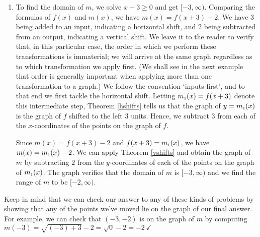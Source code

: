 {\begin{enumerate}


\item  To find the domain of $m$, we solve $x+3 \geq 0$ and get $[-3, \infty)$.  Comparing the formulas of $f(x)$ and $m(x)$, we have $m(x) = f(x+3) - 2$.  We have $3$ being added to an input, indicating a horizontal shift,  and $2$ being subtracted from an output, indicating a vertical shift. We leave it to the reader to verify that, in this particular case, the order in which we perform these transformations is immaterial;  we will arrive at the same graph regardless as to which transformation we apply first. (We shall see in the next example that order is  generally important when applying more than one transformation to a graph.) We follow the convention `inputs first', and to that end we first tackle the horizontal shift.  Letting $m_{\mbox{\tiny$1$}}(x) = f(x+3)$ denote this intermediate step,  Theorem \ref{hshifts} tells us that the graph of $y=m_{\mbox{\tiny$1$}}(x)$ is the graph of $f$ shifted to the left $3$ units. Hence, we subtract $3$ from each of the $x$-coordinates of the points on the graph of $f$.  


Since $m(x) = f(x+3)-2$ and $f(x+3) = m_{\mbox{\tiny$1$}}(x)$, we have $m(x) = m_{\mbox{\tiny$1$}}(x) - 2$.  We can apply  Theorem \ref{vshifts} and obtain the graph of $m$ by subtracting $2$ from the $y$-coordinates of each of the points on the graph of $m_{\mbox{\tiny$1$}}(x)$.  The graph verifies that the domain of $m$ is $[-3, \infty)$ and we find the range of $m$ to be $[-2, \infty)$.    


\end{enumerate}

Keep in mind that we can check our answer to any of these kinds of problems by showing that any of the points we've moved lie on the graph of our final answer.  For example, we can check that $(-3,-2)$ is on the graph of $m$ by computing  $m(-3) = \sqrt{(-3)+3} - 2 = \sqrt{0}-2 = -2\, \checkmark$
}

\medskip

